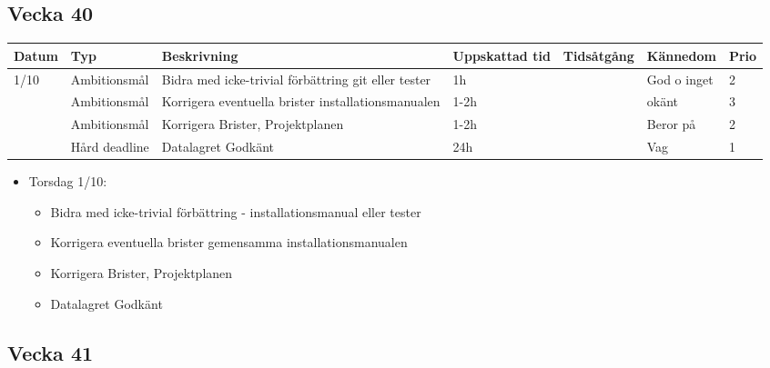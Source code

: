 \documentclass{TDP003mall}
\begin{document}
\newpage

\subsection{Vecka 40}
\begin{tabularx}{\linewidth}{|l|l|X|l|l|l|l|}
	\hline
	Datum & Typ           & Beskrivning                                         & Uppskattad tid & Tidsåtgång & Kännedom    & Prio \\ [0.5ex]
	\hline                                                      
	1/10  & Ambitionsmål  & Bidra med icke-trivial förbättring git eller tester & 1h             &            & God o inget & 2    \\
	\hline                                                      
          & Ambitionsmål  & Korrigera eventuella brister installationsmanualen  & 1-2h           &            & okänt       & 3    \\
	\hline                                                      
          & Ambitionsmål  & Korrigera Brister, Projektplanen                    & 1-2h           &            & Beror på    & 2    \\
	\hline                                                      
          & Hård deadline & Datalagret Godkänt                                  & 24h            &            & Vag         & 1    \\
	\hline
\end{tabularx}

\begin{itemize}
	\item Torsdag 1/10: 
	\begin{itemize}
		\item Bidra med icke-trivial förbättring - installationsmanual eller tester
		\item Korrigera eventuella brister gemensamma installationsmanualen
		\item Korrigera Brister, Projektplanen
		\item Datalagret Godkänt
	\end{itemize}
\end{itemize}

\subsection{Vecka 41}
\end{document}
